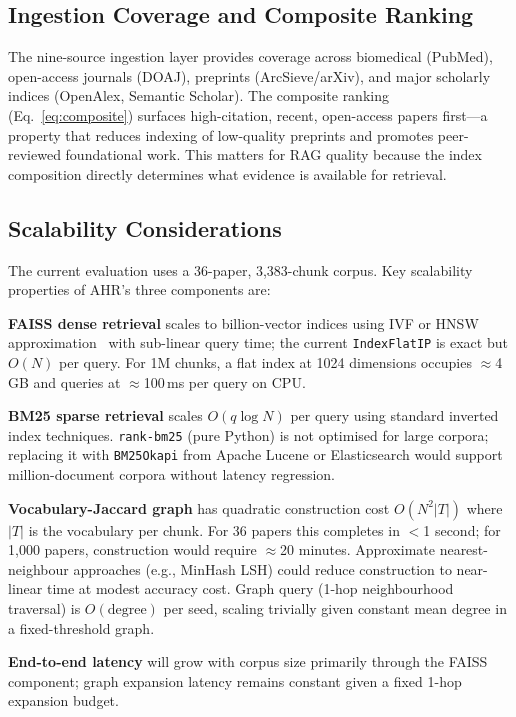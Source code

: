 \documentclass[journal]{IEEEtran}
\begin{document}
\subsection{Ingestion Coverage and Composite Ranking}
The nine-source ingestion layer provides coverage across biomedical
(PubMed), open-access journals (DOAJ), preprints (ArcSieve/arXiv),
and major scholarly indices (OpenAlex, Semantic Scholar). The
composite ranking (Eq.~\ref{eq:composite}) surfaces high-citation,
recent, open-access papers first—a property that reduces indexing
of low-quality preprints and promotes peer-reviewed foundational
work. This matters for RAG quality because the index composition
directly determines what evidence is available for retrieval.

\subsection{Scalability Considerations}

The current evaluation uses a 36-paper, 3,383-chunk corpus.
Key scalability properties of AHR's three components are:

\textbf{FAISS dense retrieval} scales to billion-vector indices
using IVF or HNSW approximation~\cite{johnson2019faiss} with
sub-linear query time; the current \texttt{IndexFlatIP} is exact
but $O(N)$ per query. For 1M chunks, a flat index at 1024 dimensions
occupies $\approx$4\,GB and queries at $\approx$100\,ms per query on CPU.

\textbf{BM25 sparse retrieval} scales $O(q \log N)$ per query
using standard inverted index techniques. \texttt{rank-bm25}
(pure Python) is not optimised for large corpora; replacing it
with \texttt{BM25Okapi} from Apache Lucene or Elasticsearch
would support million-document corpora without latency regression.

\textbf{Vocabulary-Jaccard graph} has quadratic construction cost
$O(N^2 |T|)$ where $|T|$ is the vocabulary per chunk. For 36 papers
this completes in $<$1 second; for 1,000 papers, construction would
require $\approx$20 minutes. Approximate nearest-neighbour
approaches (e.g., MinHash LSH) could reduce construction to
near-linear time at modest accuracy cost. Graph query (1-hop
neighbourhood traversal) is $O(\text{degree})$ per seed, scaling
trivially given constant mean degree in a fixed-threshold graph.

\textbf{End-to-end latency} will grow with corpus size primarily
through the FAISS component; graph expansion latency remains
constant given a fixed 1-hop expansion budget.
\end{document}
